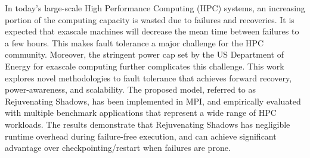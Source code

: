 In today's large-scale High Performance Computing (HPC) systems, an increasing portion of the computing capacity is wasted due to failures and recoveries. It is expected that exascale machines will decrease the mean time between failures to a few hours. This makes fault tolerance a major challenge for the HPC community. Moreover, the stringent power cap set by the US Department of Energy for exascale computing further complicates this challenge. This work explores novel methodologies to fault tolerance that achieves forward recovery, power-awareness, and scalability. The proposed model, referred to as Rejuvenating Shadows, has been implemented in MPI, and empirically evaluated with multiple benchmark applications that represent a wide range of HPC workloads. The results demonstrate that Rejuvenating Shadows has negligible runtime overhead during failure-free execution, and can achieve significant advantage over checkpointing/restart when failures are prone.


